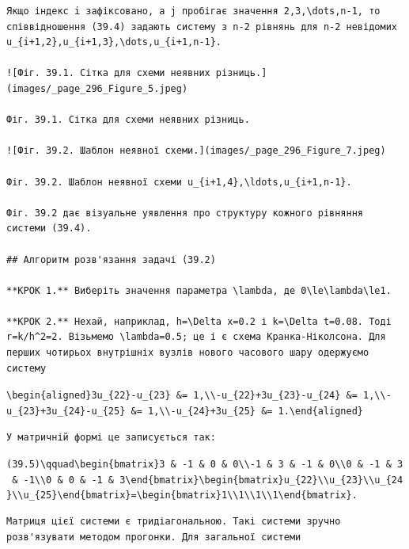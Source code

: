 \documentclass[
  ukrainian,
]{article}
\begin{document}
\begin{verbatim}
Якщо індекс i зафіксовано, а j пробігає значення 2,3,\dots,n-1, то співвідношення (39.4) задають систему з n-2 рівнянь для n-2 невідомих u_{i+1,2},u_{i+1,3},\dots,u_{i+1,n-1}.

![Фіг. 39.1. Сітка для схеми неявних різниць.](images/_page_296_Figure_5.jpeg)

Фіг. 39.1. Сітка для схеми неявних різниць.

![Фіг. 39.2. Шаблон неявної схеми.](images/_page_296_Figure_7.jpeg)

Фіг. 39.2. Шаблон неявної схеми u_{i+1,4},\ldots,u_{i+1,n-1}.

Фіг. 39.2 дає візуальне уявлення про структуру кожного рівняння системи (39.4).

## Алгоритм розв'язання задачі (39.2)

**КРОК 1.** Виберіть значення параметра \lambda, де 0\le\lambda\le1.

**КРОК 2.** Нехай, наприклад, h=\Delta x=0.2 і k=\Delta t=0.08. Тоді r=k/h^2=2. Візьмемо \lambda=0.5; це і є схема Кранка-Ніколсона. Для перших чотирьох внутрішніх вузлів нового часового шару одержуємо систему
\end{verbatim}

\texttt{\textbackslash{}begin\{aligned\}3u\_\{22\}-u\_\{23\}\ \&=\ 1,\textbackslash{}\textbackslash{}-u\_\{22\}+3u\_\{23\}-u\_\{24\}\ \&=\ 1,\textbackslash{}\textbackslash{}-u\_\{23\}+3u\_\{24\}-u\_\{25\}\ \&=\ 1,\textbackslash{}\textbackslash{}-u\_\{24\}+3u\_\{25\}\ \&=\ 1.\textbackslash{}end\{aligned\}}

\begin{verbatim}
У матричній формі це записується так:
\end{verbatim}

\texttt{(39.5)\textbackslash{}qquad\textbackslash{}begin\{bmatrix\}3\ \&\ -1\ \&\ 0\ \&\ 0\textbackslash{}\textbackslash{}-1\ \&\ 3\ \&\ -1\ \&\ 0\textbackslash{}\textbackslash{}0\ \&\ -1\ \&\ 3\ \&\ -1\textbackslash{}\textbackslash{}0\ \&\ 0\ \&\ -1\ \&\ 3\textbackslash{}end\{bmatrix\}\textbackslash{}begin\{bmatrix\}u\_\{22\}\textbackslash{}\textbackslash{}u\_\{23\}\textbackslash{}\textbackslash{}u\_\{24\}\textbackslash{}\textbackslash{}u\_\{25\}\textbackslash{}end\{bmatrix\}=\textbackslash{}begin\{bmatrix\}1\textbackslash{}\textbackslash{}1\textbackslash{}\textbackslash{}1\textbackslash{}\textbackslash{}1\textbackslash{}end\{bmatrix\}.}

\begin{verbatim}
Матриця цієї системи є тридіагональною. Такі системи зручно розв'язувати методом прогонки. Для загальної системи
\end{verbatim}
\end{document}
